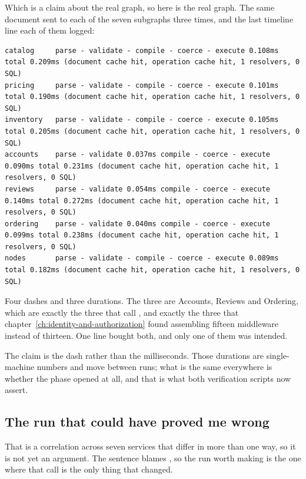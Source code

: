 %
Which is a claim about the real graph, so here is the real graph. The same
document sent to each of the seven subgraphs three times, and the last timeline
line each of them logged:

\begin{verbatim}
catalog     parse - validate - compile - coerce - execute 0.108ms total 0.209ms (document cache hit, operation cache hit, 1 resolvers, 0 SQL)
pricing     parse - validate - compile - coerce - execute 0.101ms total 0.190ms (document cache hit, operation cache hit, 1 resolvers, 0 SQL)
inventory   parse - validate - compile - coerce - execute 0.105ms total 0.205ms (document cache hit, operation cache hit, 1 resolvers, 0 SQL)
accounts    parse - validate 0.037ms compile - coerce - execute 0.090ms total 0.231ms (document cache hit, operation cache hit, 1 resolvers, 0 SQL)
reviews     parse - validate 0.054ms compile - coerce - execute 0.140ms total 0.272ms (document cache hit, operation cache hit, 1 resolvers, 0 SQL)
ordering    parse - validate 0.040ms compile - coerce - execute 0.099ms total 0.238ms (document cache hit, operation cache hit, 1 resolvers, 0 SQL)
nodes       parse - validate - compile - coerce - execute 0.089ms total 0.182ms (document cache hit, operation cache hit, 1 resolvers, 0 SQL)
\end{verbatim}

Four dashes and three durations. The three are Accounts, Reviews and Ordering,
which are exactly the three that call , and exactly
the three that chapter~\ref{ch:identity-and-authorization} found assembling
fifteen middleware instead of thirteen. One line bought both, and only one of
them was intended.

The claim is the dash rather than the milliseconds. Those durations are
single-machine numbers and move between runs; what is the same everywhere is
whether the phase opened at all, and that is what both verification scripts now
assert.

\subsection*{The run that could have proved me wrong}

%
That is a correlation across seven services that differ in more than one way, so
it is not yet an argument. The sentence blames , so the
run worth making is the one where that call is the only thing that changed.

